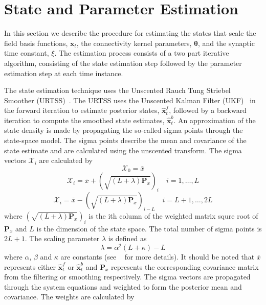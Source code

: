 \documentclass[12pt]{iopart}
\begin{document}
% 
\section{State and Parameter Estimation}\label{StateAndParameterEstimationSection} In this section we describe the procedure for estimating the states that scale the field basis functions, $\mathbf{x}_t$, the connectivity kernel parameters, $\boldsymbol \theta$, and the synaptic time constant, $\xi$. The estimation process consists of a two part iterative algorithm, consisting of the state estimation step followed by the parameter estimation step at each time instance. 

The state estimation technique uses the Unscented Rauch Tung Striebel Smoother (URTSS)~\cite{Sarkka2010}. The URTSS uses the Unscented Kalman Filter (UKF)~\cite{Julier1997,Merwe2003} in the forward iteration to estimate posterior states, $\hat{\mathbf x}_t^{f}$, followed by a backward iteration to compute the smoothed state estimates, $\hat{\mathbf x}_t^{b}$. An approximation of the state density is made by propagating the so-called sigma points through the state-space model. The sigma points describe the mean and covariance of the state estimate and are calculated using the unscented transform. The sigma vectors $\mathcal X_i$ are calculated by 
\begin{equation}\label{eq:sigmapoints1}
	\mathcal X_{0}=\bar x 
\end{equation}
\begin{equation}
	\mathcal X_{i}=\bar x+(\sqrt{( L + \lambda)\mathbf P_x})_i \quad i=1, \dots, L 
\end{equation}
\begin{equation}\label{eq:sigmapoints2}
	\mathcal X_{i}=\bar x-(\sqrt{( L + \lambda)\mathbf P_x})_{i- L} \quad i= L+1, \dots, 2 L 
\end{equation}
where $(\sqrt{( L + \lambda)\mathbf P_x})_i$ is the ith column of the weighted matrix squre root of  $\mathbf P_x$ and  $L$ is the dimension of the state space. The total number of sigma points is $2L+1$. The scaling parameter $\lambda$ is defined as 
\begin{equation}\label{eq:sigmapoints3}
	\lambda=\alpha^2( L+\kappa)- L 
\end{equation}
where $\alpha$, $\beta$ and $\kappa$ are constants (see ~\cite{Haykin2001} for more details). It should be noted that $\bar x$ represents either $\hat{\mathbf x}_t^{f}$ or $\hat{\mathbf x}_t^{b}$ and $\mathbf{P}_x$ represents the corresponding covariance matrix from the filtering or smoothing respectively. The sigma vectors are propagated through the system equations and weighted to form the posterior mean and covariance. The weights are calculated by 
\end{document}

